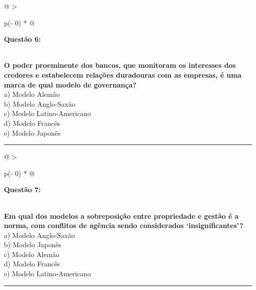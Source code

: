 \documentclass[
]{book}
\begin{document}
\begin{longtable}[]{@{}
  >{\raggedright\arraybackslash}p{(\columnwidth - 0\tabcolsep) * }@{}}
\toprule\noalign{}
\begin{minipage}[b]{\linewidth}\raggedright
\textbf{Questão 6:}
\end{minipage} \\
\midrule\noalign{}
\endhead
\bottomrule\noalign{}
\endlastfoot
\textbf{O poder proeminente dos bancos, que monitoram os interesses dos credores e estabelecem relações duradouras com as empresas, é uma marca de qual modelo de governança?} \\
a) Modelo Alemão \\
b) Modelo Anglo-Saxão \\
c) Modelo Latino-Americano \\
d) Modelo Francês \\
e) Modelo Japonês \\
\end{longtable}

\begin{center}\rule{0.5\linewidth}{0.5pt}\end{center}

\begin{longtable}[]{@{}
  >{\raggedright\arraybackslash}p{(\columnwidth - 0\tabcolsep) * }@{}}
\toprule\noalign{}
\begin{minipage}[b]{\linewidth}\raggedright
\textbf{Questão 7:}
\end{minipage} \\
\midrule\noalign{}
\endhead
\bottomrule\noalign{}
\endlastfoot
\textbf{Em qual dos modelos a sobreposição entre propriedade e gestão é a norma, com conflitos de agência sendo considerados `insignificantes'?} \\
a) Modelo Anglo-Saxão \\
b) Modelo Japonês \\
c) Modelo Alemão \\
d) Modelo Francês \\
e) Modelo Latino-Americano \\
\end{longtable}

\begin{center}\rule{0.5\linewidth}{0.5pt}\end{center}
\end{document}

